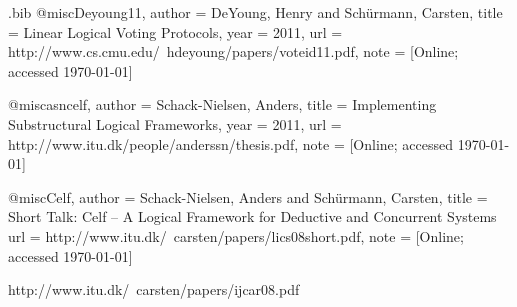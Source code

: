 \begin{filecontents*}{\jobname.bib}
@misc{Deyoung11,
	author 	= {DeYoung, Henry and Sch{\"u}rmann, Carsten},
	title 		= {{L}inear {L}ogical {V}oting {P}rotocols},
	year 		= {2011},
	url 		= {http://www.cs.cmu.edu/~hdeyoung/papers/voteid11.pdf},
	note 		= {[Online; accessed \today]}
}

@misc{asncelf,
	author 	= {Schack-Nielsen, Anders},
	title 		= {Implementing Substructural Logical Frameworks},
	year 		= {2011},
	url 		= {http://www.itu.dk/people/anderssn/thesis.pdf},
	note 		= {[Online; accessed \today]}
}

@misc{Celf,
	author 	= {Schack-Nielsen, Anders and Sch{\"u}rmann, Carsten},
	title 		= {Short Talk: Celf – A Logical Framework for Deductive and Concurrent Systems}
	url 		= {http://www.itu.dk/~carsten/papers/lics08short.pdf},
	note 		= {[Online; accessed \today]}
}


http://www.itu.dk/~carsten/papers/ijcar08.pdf
\end{filecontents*}

